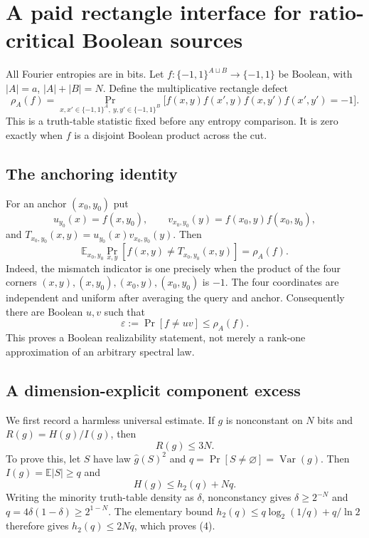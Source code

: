 \section*{A paid rectangle interface for ratio-critical Boolean sources}

All Fourier entropies are in bits.  Let
$f:\{-1,1\}^{A\sqcup B}\to\{-1,1\}$ be Boolean, with
$|A|=a$, $|A|+|B|=N$.  Define the multiplicative rectangle defect
\[
 \rho_A(f)=\Pr_{x,x'\in\{-1,1\}^A,\ y,y'\in\{-1,1\}^B}
 \bigl[f(x,y)f(x',y)f(x,y')f(x',y')=-1\bigr].       \tag{1}
\]
This is a truth-table statistic fixed before any entropy comparison.  It is
zero exactly when $f$ is a disjoint Boolean product across the cut.

\subsection*{The anchoring identity}

For an anchor $(x_0,y_0)$ put
\[
 u_{y_0}(x)=f(x,y_0),\qquad
 v_{x_0,y_0}(y)=f(x_0,y)f(x_0,y_0),
\]
and $T_{x_0,y_0}(x,y)=u_{y_0}(x)v_{x_0,y_0}(y)$.  Then
\[
 \mathbb E_{x_0,y_0}\Pr_{x,y}[f(x,y)\ne T_{x_0,y_0}(x,y)]
 =\rho_A(f).                                         \tag{2}
\]
Indeed, the mismatch indicator is one precisely when the product of the four
corners $(x,y),(x,y_0),(x_0,y),(x_0,y_0)$ is $-1$.  The four coordinates are
independent and uniform after averaging the query and anchor.  Consequently
there are Boolean $u,v$ such that
\[
 \varepsilon:=\Pr[f\ne uv]\le\rho_A(f).             \tag{3}
\]
This proves a Boolean realizability statement, not merely a rank-one
approximation of an arbitrary spectral law.

\subsection*{A dimension-explicit component excess}

We first record a harmless universal estimate.  If $g$ is nonconstant on
$N$ bits and $R(g)=H(g)/I(g)$, then
\[
 R(g)\le3N.                                           \tag{4}
\]
To prove this, let $S$ have law $\widehat g(S)^2$ and
$q=\Pr[S\ne\varnothing]=\operatorname{Var}(g)$.  Then
$I(g)=\mathbb E|S|\ge q$ and
\[
 H(g)\le h_2(q)+Nq.
\]
Writing the minority truth-table density as $\delta$, nonconstancy gives
$\delta\ge2^{-N}$ and $q=4\delta(1-\delta)\ge2^{1-N}$.  The elementary bound
$h_2(q)\le q\log_2(1/q)+q/\ln2$ therefore gives
$h_2(q)\le2Nq$, which proves (4).

